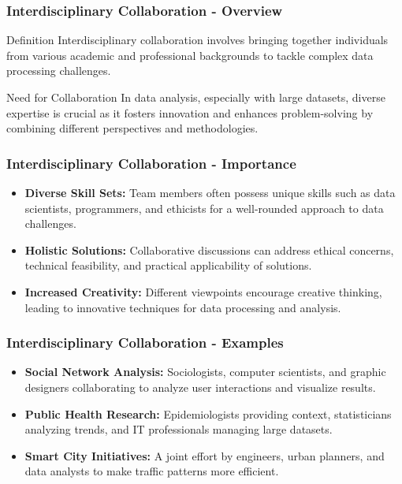 \documentclass[aspectratio=169]{beamer}
\begin{document}
\begin{frame}[fragile]
    \frametitle{Interdisciplinary Collaboration - Overview}
    \begin{block}{Definition}
    Interdisciplinary collaboration involves bringing together individuals from various academic and professional backgrounds to tackle complex data processing challenges.
    \end{block}
    \begin{block}{Need for Collaboration}
    In data analysis, especially with large datasets, diverse expertise is crucial as it fosters innovation and enhances problem-solving by combining different perspectives and methodologies.
    \end{block}
\end{frame}

\begin{frame}[fragile]
    \frametitle{Interdisciplinary Collaboration - Importance}
    \begin{itemize}
        \item \textbf{Diverse Skill Sets:} Team members often possess unique skills such as data scientists, programmers, and ethicists for a well-rounded approach to data challenges.
        \item \textbf{Holistic Solutions:} Collaborative discussions can address ethical concerns, technical feasibility, and practical applicability of solutions.
        \item \textbf{Increased Creativity:} Different viewpoints encourage creative thinking, leading to innovative techniques for data processing and analysis.
    \end{itemize}
\end{frame}

\begin{frame}[fragile]
    \frametitle{Interdisciplinary Collaboration - Examples}
    \begin{itemize}
        \item \textbf{Social Network Analysis:} Sociologists, computer scientists, and graphic designers collaborating to analyze user interactions and visualize results.
        \item \textbf{Public Health Research:} Epidemiologists providing context, statisticians analyzing trends, and IT professionals managing large datasets.
        \item \textbf{Smart City Initiatives:} A joint effort by engineers, urban planners, and data analysts to make traffic patterns more efficient.
    \end{itemize}
\end{frame}
\end{document}
